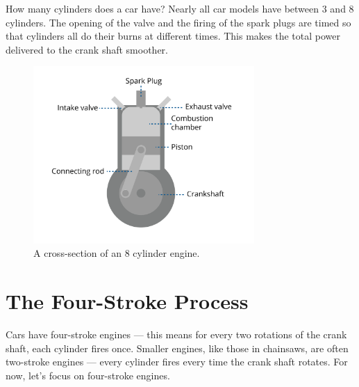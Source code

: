 How many cylinders does a car have? Nearly all car models have between 3 and 8 cylinders. The opening of the valve and the firing of the spark plugs are timed so that cylinders all do their burns 
at different times. This makes the total power delivered to the crank shaft smoother.

\begin{figure}[htbp]
    \centering
    \includegraphics[width=0.75\textwidth]{engine-08.png}
    \caption{A cross-section of an 8 cylinder engine.}
    \label{fig:engine-08}
\end{figure}


\section{The Four-Stroke Process}
Cars have four-stroke engines --- this means for every two rotations of the crank shaft, each cylinder fires once. Smaller engines, like those in chainsaws, are often two-stroke engines --- every cylinder fires every time the crank shaft rotates. For now, let's focus on four-stroke engines.


